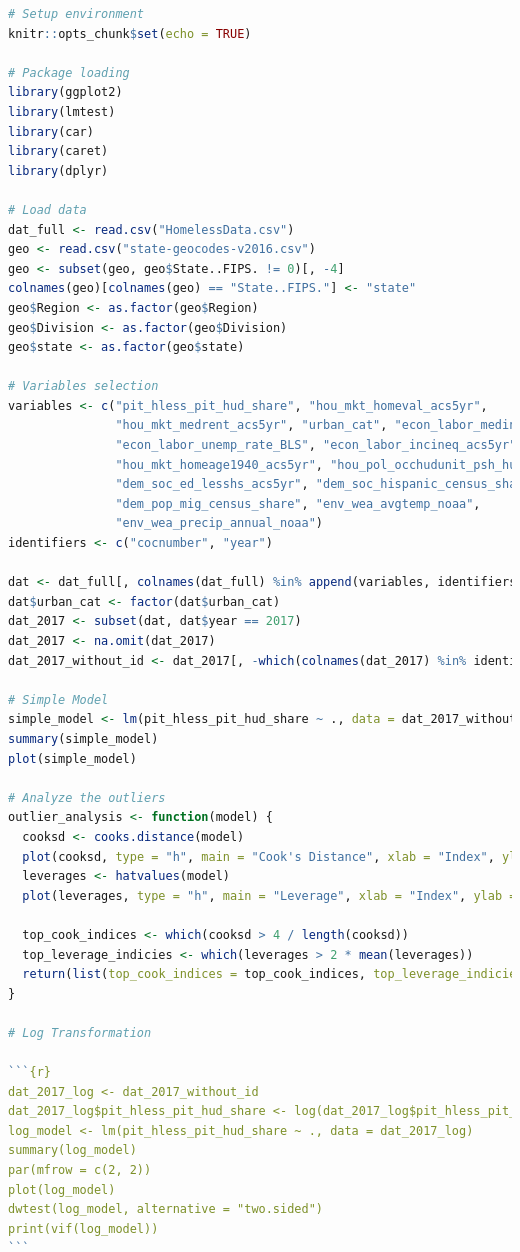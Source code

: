 \documentclass[12pt]{article}
\begin{document}
\begin{lstlisting}[language=R]
# Setup environment
knitr::opts_chunk$set(echo = TRUE)

# Package loading
library(ggplot2)
library(lmtest)
library(car)
library(caret)
library(dplyr)

# Load data
dat_full <- read.csv("HomelessData.csv")
geo <- read.csv("state-geocodes-v2016.csv")
geo <- subset(geo, geo$State..FIPS. != 0)[, -4]
colnames(geo)[colnames(geo) == "State..FIPS."] <- "state"
geo$Region <- as.factor(geo$Region)
geo$Division <- as.factor(geo$Division)
geo$state <- as.factor(geo$state)

# Variables selection
variables <- c("pit_hless_pit_hud_share", "hou_mkt_homeval_acs5yr", 
               "hou_mkt_medrent_acs5yr", "urban_cat", "econ_labor_medinc_acs5yr",
               "econ_labor_unemp_rate_BLS", "econ_labor_incineq_acs5yr",
               "hou_mkt_homeage1940_acs5yr", "hou_pol_occhudunit_psh_hud", 
               "dem_soc_ed_lesshs_acs5yr", "dem_soc_hispanic_census_share",
               "dem_pop_mig_census_share", "env_wea_avgtemp_noaa", 
               "env_wea_precip_annual_noaa")
identifiers <- c("cocnumber", "year")

dat <- dat_full[, colnames(dat_full) %in% append(variables, identifiers)]
dat$urban_cat <- factor(dat$urban_cat)
dat_2017 <- subset(dat, dat$year == 2017)
dat_2017 <- na.omit(dat_2017)
dat_2017_without_id <- dat_2017[, -which(colnames(dat_2017) %in% identifiers)]

# Simple Model
simple_model <- lm(pit_hless_pit_hud_share ~ ., data = dat_2017_without_id)
summary(simple_model)
plot(simple_model)

# Analyze the outliers
outlier_analysis <- function(model) {
  cooksd <- cooks.distance(model)
  plot(cooksd, type = "h", main = "Cook's Distance", xlab = "Index", ylab = "Cook's Distance", ylim = c(0.0, 0.5))
  leverages <- hatvalues(model)
  plot(leverages, type = "h", main = "Leverage", xlab = "Index", ylab = "Leverage", ylim = c(0.0, 0.5))
  
  top_cook_indices <- which(cooksd > 4 / length(cooksd))
  top_leverage_indicies <- which(leverages > 2 * mean(leverages))
  return(list(top_cook_indices = top_cook_indices, top_leverage_indicies= top_leverage_indicies))
}

# Log Transformation

```{r}
dat_2017_log <- dat_2017_without_id
dat_2017_log$pit_hless_pit_hud_share <- log(dat_2017_log$pit_hless_pit_hud_share)
log_model <- lm(pit_hless_pit_hud_share ~ ., data = dat_2017_log)
summary(log_model)
par(mfrow = c(2, 2))
plot(log_model)
dwtest(log_model, alternative = "two.sided")
print(vif(log_model))
```


\end{lstlisting}
\end{document}
